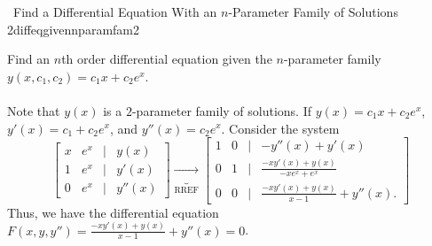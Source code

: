         \begin{example}{\Difficulty\,\Difficulty\,\,Find a Differential Equation With an \(n\)-Parameter Family of Solutions 2}{diffeqgivennparamfam2}
            
            Find an \(n\)th order differential equation given the \(n\)-parameter family \(y(x,c_1,c_2)=c_1x+c_2e^x\).
            \\
            \\
            Note that \(y(x)\) is a \(2\)-parameter family of solutions. If \(y(x)=c_1x+c_2e^x\), \(y'(x)=c_1+c_2e^x\), and \(y''(x)=c_2e^x\). Consider the system
            \begin{equation*}
                \begin{bmatrix}
                    x & e^x & | & y(x) \\
                    1 & e^x & | & y'(x) \\
                    0 & e^x & | & y''(x)
                \end{bmatrix}\underbrace{\to}_{\text{RREF}}
                \begin{bmatrix}
                    1 & 0 & | & -y''(x)+y'(x) \\
                    0 & 1 & | & \frac{-xy'(x)+y(x)}{-xe^x+e^x} \\
                    0 & 0 & | & \frac{-xy'(x)+y(x)}{x-1}+y''(x).
                \end{bmatrix}
            \end{equation*}
            Thus, we have the differential equation \(F(x,y,y'')=\frac{-xy'(x)+y(x)}{x-1}+y''(x)=0\).
        \end{example}
